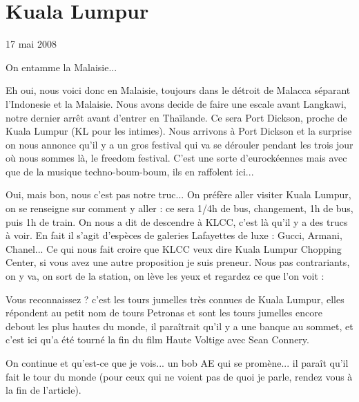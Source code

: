 \section{Kuala Lumpur}

17 mai 2008

\begin{multicols}{2}

On entamme la Malaisie...

Eh oui, nous voici donc en Malaisie, toujours dans le détroit de Malacca séparant l'Indonesie et la Malaisie. Nous avons decide de faire une escale avant Langkawi, notre dernier arrêt avant d'entrer en Thaïlande. Ce sera Port Dickson, proche de Kuala Lumpur (KL pour les intimes). Nous arrivons à Port Dickson et la surprise on nous annonce qu'il y a un gros festival qui va se dérouler pendant les trois jour où nous sommes là, le freedom festival. C'est une sorte d'eurockéennes mais avec que de la musique techno-boum-boum, ils en raffolent ici...

Oui, mais bon, nous c'est pas notre truc... On préfère aller visiter Kuala Lumpur, on se renseigne sur comment y aller : ce sera 1/4h de bus, changement, 1h de bus, puis 1h de train. On nous a dit de descendre à KLCC, c'est là qu'il y a des trucs à voir. En fait il s'agit d'espèces de galeries Lafayettes de luxe : Gucci, Armani, Chanel... Ce qui nous fait croire que KLCC veux dire Kuala Lumpur Chopping Center, si vous avez une autre proposition je suis preneur. Nous pas contrariants, on y va, on sort de la station, on lève les yeux et regardez ce que l'on voit :


Vous reconnaissez ? c'est les tours jumelles très connues de Kuala Lumpur, elles répondent au petit nom de tours Petronas et sont les tours jumelles encore debout les plus hautes du monde, il paraîtrait qu'il y a une banque au sommet, et c'est ici qu'a été tourné la fin du film Haute Voltige avec Sean Connery.

On continue et qu'est-ce que je vois... un bob AE qui se promène... il paraît qu'il fait le tour du monde (pour ceux qui ne voient pas de quoi je parle, rendez vous à la fin de l'article).



\end{multicols}
